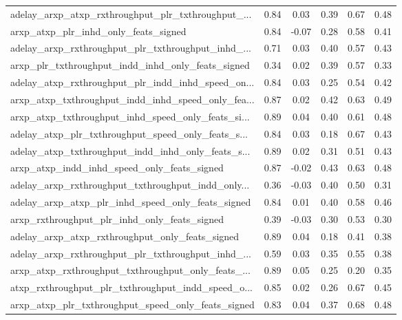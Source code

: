 \begin{tabular}{|l|*{4}{c}|r|}
adelay\_arxp\_atxp\_rxthroughput\_plr\_txthroughput\_... & 0.84 &  0.03 &    0.39 &       0.67 &  0.48 \\
arxp\_atxp\_plr\_inhd\_only\_feats\_signed               & 0.84 & -0.07 &    0.28 &       0.58 &  0.41 \\
adelay\_arxp\_rxthroughput\_plr\_txthroughput\_inhd\_... & 0.71 &  0.03 &    0.40 &       0.57 &  0.43 \\
arxp\_plr\_txthroughput\_indd\_inhd\_only\_feats\_signed  & 0.34 &  0.02 &    0.39 &       0.57 &  0.33 \\
adelay\_atxp\_rxthroughput\_plr\_indd\_inhd\_speed\_on... & 0.84 &  0.03 &    0.25 &       0.54 &  0.42 \\
arxp\_atxp\_txthroughput\_indd\_inhd\_speed\_only\_fea... & 0.87 &  0.02 &    0.42 &       0.63 &  0.49 \\
arxp\_atxp\_txthroughput\_inhd\_speed\_only\_feats\_si... & 0.89 &  0.04 &    0.40 &       0.61 &  0.48 \\
adelay\_atxp\_plr\_txthroughput\_speed\_only\_feats\_s... & 0.84 &  0.03 &    0.18 &       0.67 &  0.43 \\
adelay\_atxp\_txthroughput\_indd\_inhd\_only\_feats\_s... & 0.89 &  0.02 &    0.31 &       0.51 &  0.43 \\
arxp\_atxp\_indd\_inhd\_speed\_only\_feats\_signed        & 0.87 & -0.02 &    0.43 &       0.63 &  0.48 \\
adelay\_arxp\_rxthroughput\_txthroughput\_indd\_only... & 0.36 & -0.03 &    0.40 &       0.50 &  0.31 \\
adelay\_arxp\_atxp\_plr\_inhd\_speed\_only\_feats\_signed  & 0.84 &  0.01 &    0.40 &       0.58 &  0.46 \\
arxp\_rxthroughput\_plr\_inhd\_only\_feats\_signed       & 0.39 & -0.03 &    0.30 &       0.53 &  0.30 \\
adelay\_arxp\_atxp\_rxthroughput\_only\_feats\_signed    & 0.89 &  0.04 &    0.18 &       0.41 &  0.38 \\
adelay\_arxp\_rxthroughput\_plr\_txthroughput\_inhd\_... & 0.59 &  0.03 &    0.35 &       0.55 &  0.38 \\
arxp\_atxp\_rxthroughput\_txthroughput\_only\_feats\_... & 0.89 &  0.05 &    0.25 &       0.20 &  0.35 \\
atxp\_rxthroughput\_plr\_txthroughput\_indd\_speed\_o... & 0.85 &  0.02 &    0.26 &       0.67 &  0.45 \\
arxp\_atxp\_plr\_txthroughput\_speed\_only\_feats\_signed & 0.83 &  0.04 &    0.37 &       0.68 &  0.48 \\

\end{tabular}
